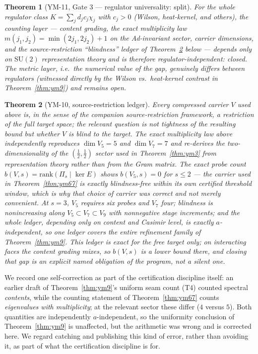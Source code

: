 \documentclass[aps,prd,twocolumn,superscriptaddress,nofootinbib]{revtex4-2}
\newcommand{\SU}{\mathrm{SU}(2)}
\newtheorem{theorem}{Theorem}
\begin{document}
\begin{theorem}[YM-11, Gate 3 --- regulator universality: split]\label{thm:ym11b}
For the whole regulator class $K=\sum_j d_j c_j\chi_j$ with $c_j>0$
(Wilson, heat-kernel, and others), the \emph{counting} layer --- content
grading, the exact multiplicity law $m(j_1,j_2)=\min(2j_1,2j_2)+1$ on the
Ad-invariant sector, carrier dimensions, and the source-restriction
``blindness'' ledger of Theorem~\ref{thm:ym10} below --- depends only on
$\SU$ representation theory and is therefore regulator-independent:
closed. The \emph{metric} layer, i.e.\ the numerical value of the gap,
genuinely differs between regulators (witnessed directly by the Wilson
vs.\ heat-kernel contrast in Theorem~\ref{thm:ym9}) and remains open.
\end{theorem}

\begin{theorem}[YM-10, source-restriction ledger]\label{thm:ym10}
Every compressed carrier $V$ used above is, in the sense of the
companion source-restriction framework, a restriction of the full target
space; the relevant question is not tightness of the resulting bound but
whether $V$ is \emph{blind} to the target. The exact multiplicity law
above independently reproduces $\dim V_5=5$ and $\dim V_7=7$ and
re-derives the two-dimensionality of the $(\tfrac12,\tfrac12)$ sector
used in Theorem~\ref{thm:ym3} from representation theory rather than from
the Gram matrix. The exact probe count $b(V,s)=\mathrm{rank}(\Pi_s\mid
\ker E)$ shows $b(V_5,s)=0$ for $s\le2$ --- the carrier used in
Theorem~\ref{thm:ym67} is exactly blindness-free within its own certified
threshold window, which is why that choice of carrier was correct and not
merely convenient. At $s=3$, $V_5$ requires six probes and $V_7$ four;
blindness is nonincreasing along $V_5\subset V_7\subset V_9$ with
nonnegative stage increments; and the whole ledger, depending only on
content and Casimir level, is exactly $a$-independent, so one ledger
covers the entire refinement family of Theorem~\ref{thm:ym9}. This ledger
is exact for the free target only; on interacting faces the content
grading mixes, so $b(V,s)$ is a lower bound there, and closing that gap
is an explicit named obligation of the program, not a silent one.
\end{theorem}

We record one self-correction as part of the certification discipline
itself: an earlier draft of Theorem~\ref{thm:ym9}'s uniform seam count
(T4) counted spectral \emph{contents}, while the counting statement of
Theorem~\ref{thm:ym67} counts \emph{eigenvalues with multiplicity}; at
the relevant sector these differ ($4$ versus $5$). Both quantities are
independently $a$-independent, so the uniformity conclusion of
Theorem~\ref{thm:ym9} is unaffected, but the arithmetic was wrong and is
corrected here. We regard catching and publishing this kind of error,
rather than avoiding it, as part of what the certification discipline is
for.
\end{document}
